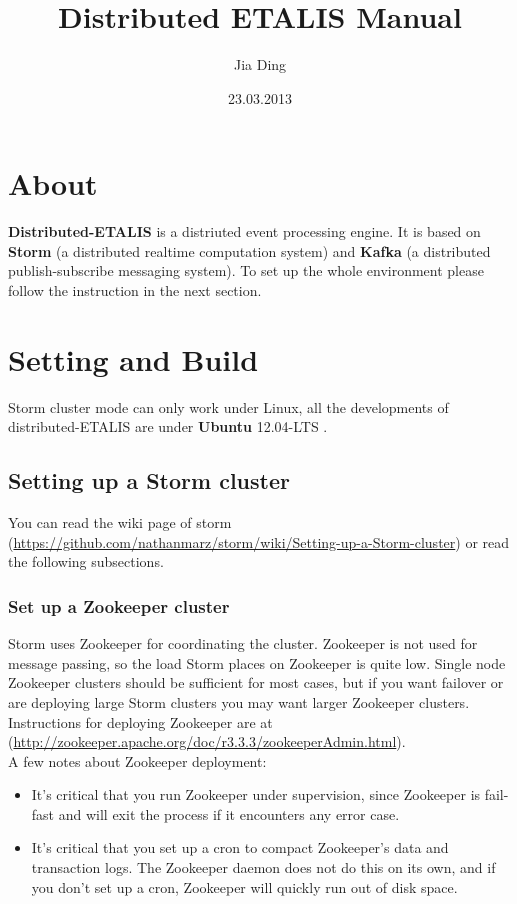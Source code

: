 \documentclass[a4paper, 12pt]{article}
\begin{document}
\hypersetup{colorlinks, linkcolor=red}

\title{\textbf{Distributed ETALIS Manual}}
\author{Jia Ding}
\date{23.03.2013}
\maketitle

\newpage
\tableofcontents

\newpage
\section{About}
\textbf{Distributed-ETALIS} is a distriuted event processing engine. It is based on \textbf{Storm} \cite{web:storm} (a distributed realtime computation system) and \textbf{Kafka} \cite{web:kafka} (a distributed publish-subscribe messaging system). To set up the whole environment please follow the instruction in the next section.

\section{Setting and Build}
Storm cluster mode can only work under Linux, all the developments of distributed-ETALIS are under \textbf{Ubuntu} 12.04-LTS \cite{web:ubuntu}. 

\subsection{Setting up a Storm cluster}
You can read the wiki page of storm (\url{https://github.com/nathanmarz/storm/wiki/Setting-up-a-Storm-cluster}) or read the following subsections.
\subsubsection{Set up a Zookeeper cluster}
Storm uses Zookeeper for coordinating the cluster. Zookeeper is not used for message passing, so the load Storm places on Zookeeper is quite low. Single node Zookeeper clusters should be sufficient for most cases, but if you want failover or are deploying large Storm clusters you may want larger Zookeeper clusters. Instructions for deploying Zookeeper are at (\url{http://zookeeper.apache.org/doc/r3.3.3/zookeeperAdmin.html}).\\

A few notes about Zookeeper deployment:
\begin{itemize}
\item It's critical that you run Zookeeper under supervision, since Zookeeper is fail-fast and will exit the process if it encounters any error case.
\item It's critical that you set up a cron to compact Zookeeper's data and transaction logs. The Zookeeper daemon does not do this on its own, and if you don't set up a cron, Zookeeper will quickly run out of disk space.
\end{itemize}
\end{document}
